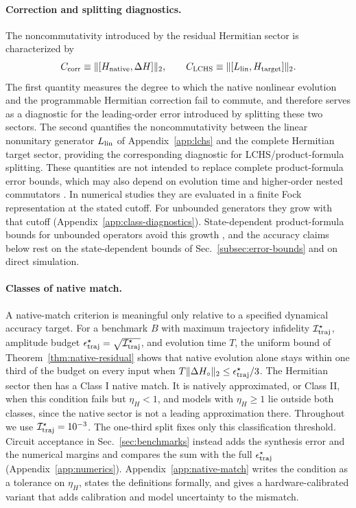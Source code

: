 \documentclass[pra,twocolumn,superscriptaddress,nofootinbib,floatfix]{revtex4-2}
\theoremstyle{remark}
\newcommand{\revcolor}{\color{blue}}
\DeclareRobustCommand{\rev}[1]{{\revcolor #1}}
\begin{document}
\paragraph{Correction and splitting diagnostics.}
The noncommutativity introduced by the residual Hermitian sector is characterized by
\begin{align}
C_{\rm corr}\equiv\|[H_{\rm native},\Delta H]\|_2, \qquad C_{\rm LCHS}\equiv\|[L_{\rm lin},H_{\rm target}]\|_2 .
\label{eq:combined-cost-diagnostics}
\end{align}
The first quantity measures the degree to which the native nonlinear evolution and the programmable Hermitian correction fail to commute, and therefore serves as a diagnostic for the leading-order error introduced by splitting these two sectors. \rev{The second quantifies the noncommutativity between the linear nonunitary generator \(L_{\rm lin}\) of Appendix~\ref{app:lchs} and the complete Hermitian target sector, providing the corresponding diagnostic for LCHS/product-formula splitting.} \rev{These quantities are not intended to replace complete product-formula error bounds, which may also depend on evolution time and higher-order nested commutators \cite{Childs2021Trotter}.} \rev{In numerical studies they are evaluated in a finite Fock representation at the stated cutoff.} \rev{For unbounded generators they grow with that cutoff (Appendix~\ref{app:class-diagnostics}).} \rev{State-dependent product-formula bounds for unbounded operators avoid this growth \cite{AnFangLin2021,Sahinoglu2021,Burgarth2024Strong}, and the accuracy claims below rest on the state-dependent bounds of Sec.~\ref{subsec:error-bounds} and on direct simulation.}

\paragraph{Classes of native match.}
A native-match criterion is meaningful only relative to a specified dynamical accuracy target. \rev{For a benchmark \(B\) with maximum trajectory infidelity \(\mathcal I_{\rm traj}^{\star}\), amplitude budget \(\epsilon_{\rm traj}^{\star}=\sqrt{\mathcal I_{\rm traj}^{\star}}\), and evolution time \(T\), the uniform bound of Theorem~\ref{thm:native-residual} shows that native evolution alone stays within one third of the budget on every input when \(T\|\Delta H_\circ\|_2\le\epsilon_{\rm traj}^\star/3\).} \rev{The Hermitian sector then has a Class I native match.} \rev{It is natively approximated, or Class II, when this condition fails but \(\eta_H<1\), and models with \(\eta_H\geq1\) lie outside both classes, since the native sector is not a leading approximation there.} \rev{Throughout we use \(\mathcal I_{\rm traj}^\star=10^{-3}\).} \rev{The one-third split fixes only this classification threshold.} \rev{Circuit acceptance in Sec.~\ref{sec:benchmarks} instead adds the synthesis error and the numerical margins and compares the sum with the full \(\epsilon_{\rm traj}^\star\) (Appendix~\ref{app:numerics}).} \rev{Appendix~\ref{app:native-match} writes the condition as a tolerance on \(\eta_H\), states the definitions formally, and gives a hardware-calibrated variant that adds calibration and model uncertainty to the mismatch.}
\end{document}
